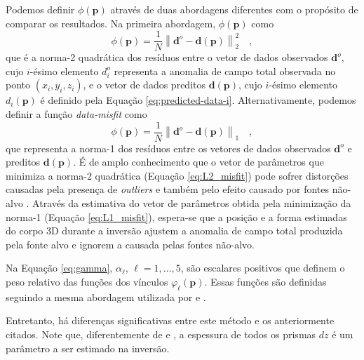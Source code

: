 Podemos definir $\phi (\mathbf{p})$ através de duas abordagens diferentes com o propósito de comparar os resultados. Na primeira abordagem, $\phi (\mathbf{p})$ como
\begin{equation}\label{eq:L2_misfit}
\phi (\mathbf{p}) = \frac{1}{N} 
\left\| \mathbf{d}^{o} - \mathbf{d}(\mathbf{p}) \right\|_{2}^{2} \quad ,
\end{equation}
que é a norma-2 quadrática \citep[por exemplo,][p. 331]{aster_etal2019} dos resíduos entre o vetor de dados observados $\mathbf{d}^{o}$, cujo $i$-ésimo elemento $d_{i}^{o}$ representa a anomalia de campo total observada no ponto $(x_{i}, y_{i}, z_{i})$, e o vetor de dados preditos $\mathbf{d}(\mathbf{p})$, cujo $i$-ésimo elemento $d_{i} (\mathbf{p})$ é definido pela Equação \ref{eq:predicted-data-i}.
Alternativamente, podemos definir a função \textit{data-misfit} como
\begin{equation}\label{eq:L1_misfit}
\phi (\mathbf{p}) = \frac{1}{N} 
\left\| \mathbf{d}^{o} - \mathbf{d}(\mathbf{p}) \right\|_{1} \quad ,
\end{equation}
que representa a norma-1 \citep[por exemplo,][p. 331]{aster_etal2019}
dos resíduos entre os vetores de dados observados $\mathbf{d}^{o}$ e preditos $\mathbf{d}(\mathbf{p})$.
É de amplo conhecimento que o vetor de parâmetros que minimiza a norma-2 quadrática (Equação \ref{eq:L2_misfit}) pode sofrer distorções causadas pela presença de \textit{outliers} e também pelo efeito causado por fontes não-alvo \cite[por exemplo,][]{claerbout_muir1973, 
	silva_hohmann1983, scales_gersztenkorn1988, silva_cutrim1989, farquharson_oldenburg1998, 
	uieda_barbosa2012, oliveirajr_etal2015, aster_etal2019}.
Através da estimativa do vetor de parâmetros obtida pela minimização da norma-1 (Equação \ref{eq:L1_misfit}), espera-se que a posição e a forma estimadas do corpo 3D durante a inversão ajustem a anomalia de campo total produzida pela fonte alvo e ignorem a causada pelas fontes não-alvo.

Na Equação \ref{eq:gamma}, $\alpha_{\ell}$, $\ell = 1, \dots, 5$, são escalares positivos que definem o peso relativo das funções dos vínculos $\varphi_{\ell}(\mathbf{p})$.
Essas funções são definidas seguindo a mesma abordagem utilizada por \citet{oliveirajr_etal2011} e \citet{oliveirajr_barbosa2013}.

Entretanto, há diferenças significativas entre este método e os anteriormente citados.
Note que, diferentemente de \cite{oliveirajr_etal2011} e \cite{oliveirajr_barbosa2013}, a espessura de todos os prismas $ dz $ é um parâmetro a ser estimado na inversão. 

